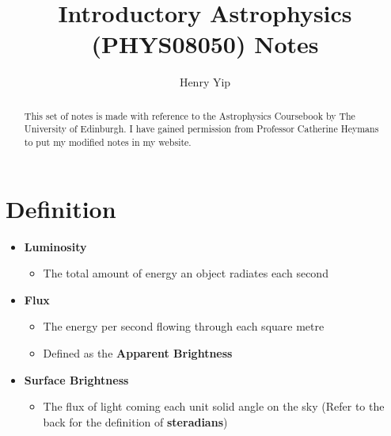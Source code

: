 \documentclass{article}
\title{Introductory Astrophysics (PHYS08050) Notes}
\author{Henry Yip}
\begin{document}
\maketitle
\begin{abstract}
This set of notes is made with reference to the Astrophysics Coursebook by The University of Edinburgh. I have gained permission from Professor Catherine Heymans to put my modified notes in my website.
\end{abstract}
\section{Definition}
\begin{itemize}
\item \textbf{Luminosity}
\begin{itemize}
\item The total amount of energy an object radiates each second
\end{itemize}
\item \textbf{Flux}
\begin{itemize}
\item The energy per second flowing through each square metre
\item Defined as the \textbf{Apparent Brightness}
\end{itemize}
\item \textbf{Surface Brightness }
\begin{itemize}
\item The flux of light coming each unit solid angle on the sky (Refer to the back for the definition of \textbf{steradians})
\end{itemize}
\end{itemize}
\end{document}
